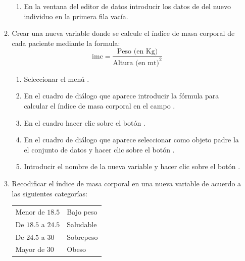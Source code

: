 \begin{enumerate}[leftmargin=*]
\begin{enumerate}
\begin{indicacion}{
\begin{enumerate}
\item En la ventana del editor de datos introducir los datos de del nuevo individuo en la primera fila vacía.
\end{enumerate}
}
\end{indicacion}

\item Crear una nueva variable donde se calcule el índice de masa corporal de cada paciente mediante la formula:
\[
\text{imc} = \frac{\text{Peso (en Kg)}}{\text{Altura (en mt)}^2}
\]

\begin{indicacion}{
\begin{enumerate}
\item Seleccionar el menú .
\item En el cuadro de diálogo que aparece introducir la fórmula para calcular el índice de masa
corporal en el campo .
\item En el cuadro  hacer clic sobre el botón .
\item En el cuadro de diálogo que aparece seleccionar como objeto padre la el conjunto de datos  y hacer clic sobre el botón .
\item Introducir el nombre de la nueva variable  y hacer clic sobre el botón .
\end{enumerate} 
}
\end{indicacion}

\item Recodificar el índice de masa corporal en una nueva variable de acuerdo a las siguientes categorías:
\begin{center}
\begin{tabular}{ll}
Menor de $18.5$ & Bajo peso\\
De $18.5$ a $24.5$ & Saludable\\
De $24.5$ a $30$ & Sobrepeso\\
Mayor de $30$  & Obeso
\end{tabular}
\end{center}


\end{enumerate}
\end{enumerate}
